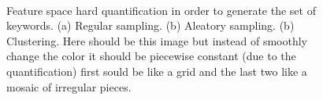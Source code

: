 \documentclass[a4paper, 10pt, conference]{llncs}      %
\begin{document}
\begin{figure}[Htbp]
\centering
{}\,
\,
\caption{Feature space hard quantification in order to generate the set of keywords. (a) Regular sampling. (b) Aleatory sampling. (b) Clustering.{\color{red} Here should be this image but instead of smoothly change the color it should be piecewise constant (due to the quantification) first sould be like a grid and the last two like a mosaic of irregular pieces.}}
\label{fig:dictionary}
\end{figure}
\end{document}
